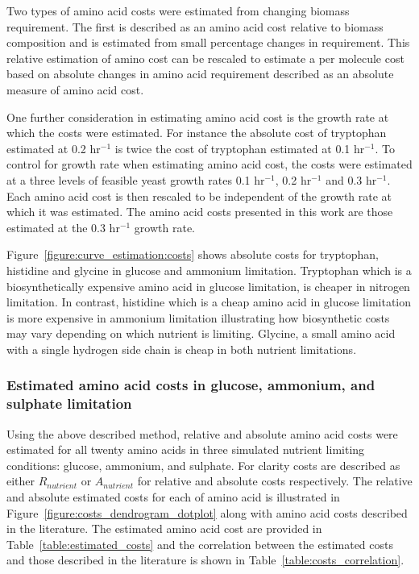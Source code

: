 Two types of amino acid costs were estimated from changing biomass requirement. The first is described as an amino acid cost relative to biomass composition and is estimated from small percentage changes in requirement. This relative estimation of amino cost can be rescaled to estimate a per molecule cost based on absolute changes in amino acid requirement described as an absolute measure of amino acid cost.

One further consideration in estimating amino acid cost is the growth rate at which the costs were estimated. For instance the absolute cost of tryptophan estimated at 0.2 hr$^{-1}$ is twice the cost of tryptophan estimated at 0.1 hr$^{-1}$. To control for growth rate when estimating amino acid cost, the costs were estimated at a three levels of feasible yeast growth rates 0.1 hr$^{-1}$, 0.2 hr$^{-1}$ and 0.3 hr$^{-1}$. Each amino acid cost is then rescaled to be independent of the growth rate at which it was estimated. The amino acid costs presented in this work are those estimated at the 0.3 hr$^{-1}$ growth rate.

Figure~\ref{figure:curve_estimation:costs} shows absolute costs for tryptophan, histidine and glycine in glucose and ammonium limitation. Tryptophan which is a biosynthetically expensive amino acid in glucose limitation, is cheaper in nitrogen limitation. In contrast, histidine which is a cheap amino acid in glucose limitation is more expensive in ammonium limitation illustrating how biosynthetic costs may vary depending on which nutrient is limiting. Glycine, a small amino acid with a single hydrogen side chain is cheap in both nutrient limitations.

\subsubsection{Estimated amino acid costs in glucose, ammonium, and sulphate limitation}%

Using the above described method, relative and absolute amino acid costs were estimated for all twenty amino acids in three simulated nutrient limiting conditions: glucose, ammonium, and sulphate. For clarity costs are described as either $R_{nutrient}$ or $A_{nutrient}$ for relative and absolute costs respectively. The relative and absolute estimated costs for each of amino acid is illustrated in Figure~\vref{figure:costs_dendrogram_dotplot} along with amino acid costs described in the literature. The estimated amino acid cost are provided in Table~\vref{table:estimated_costs} and the correlation between the estimated costs and those described in the literature is shown in Table~\vref{table:costs_correlation}.

